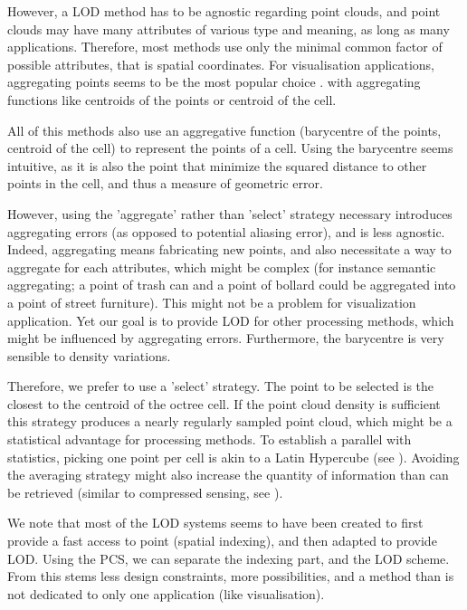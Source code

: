 	However, a LOD method has to be agnostic regarding point clouds,
	and point clouds may have many attributes of various type and meaning, as long as many applications.
	Therefore, most methods use only the minimal common factor of possible attributes, that is spatial coordinates. 
	For visualisation applications, aggregating points seems to be the most popular choice \cite{Schutz2015,Hornung2013,Elseberg2013}. with aggregating functions like centroids of the points or centroid of the cell.
	
	All of this methods also use an aggregative function (barycentre of the points, centroid of the cell) to represent the points of a cell.
	Using the barycentre seems intuitive, as it is also the point that minimize the squared distance to other points in the cell, and thus a measure of geometric error.
	
	However, using the 'aggregate' rather than 'select' strategy necessary introduces aggregating errors
	 (as opposed to potential aliasing error), and is less agnostic.
	Indeed, aggregating means fabricating new points, and also necessitate a way to aggregate for each attributes, which might be complex (for instance semantic aggregating; a point of trash can and a point of bollard could be aggregated into a point of street furniture).
	This might not be a problem for visualization application.
	Yet our goal is to provide LOD for other processing methods, which might be influenced by aggregating errors.
	Furthermore, the barycentre is very sensible to density variations.
	
	Therefore, we prefer to use a 'select' strategy. The point to be selected is the closest to the centroid of the octree cell.
	If the point cloud density is sufficient this strategy produces a nearly regularly sampled point cloud, which might be a statistical advantage for processing methods. 
	To establish a parallel with statistics, picking one point per cell is akin to a Latin Hypercube (see \cite{McKay1979}).
	Avoiding the averaging strategy might also increase the quantity of information than can be retrieved (similar to compressed sensing, see \cite{Fornasier2010}).
	
	
	We note that most of the LOD systems seems to have been created to first provide a fast access to point (spatial indexing), and then adapted to provide LOD.
	Using the PCS, we can separate the indexing part, and the LOD scheme. From this stems less design constraints, more possibilities, and a method than is not dedicated to only one application (like visualisation). 
	

